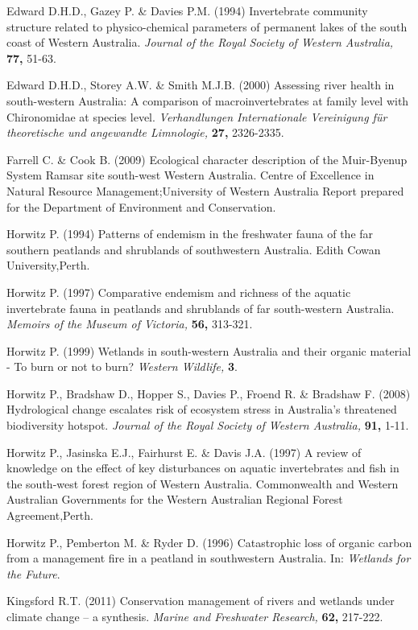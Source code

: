 \documentclass[version=last,
    paper=a4, %
    10pt, %
    usenames,
    dvipsnames,
    oneside, %
    headings=openany, %
    DIV=15 %
]{scrbook}
\begin{document}
Edward D.H.D., Gazey P. \& Davies P.M. (1994) Invertebrate community
structure related to physico-chemical parameters of permanent lakes of
the south coast of Western Australia. \emph{Journal of the Royal Society
of Western Australia,} \textbf{77,} 51-63.

Edward D.H.D., Storey A.W. \& Smith M.J.B. (2000) Assessing river health
in south-western Australia: A comparison of macroinvertebrates at family
level with Chironomidae at species level. \emph{Verhandlungen
Internationale Vereinigung für theoretische und angewandte Limnologie,}
\textbf{27,} 2326-2335.

Farrell C. \& Cook B. (2009) Ecological character description of the
Muir-Byenup System Ramsar site south-west Western Australia. Centre of
Excellence in Natural Resource Management;University of Western
Australia Report prepared for the Department of Environment and
Conservation.

Horwitz P. (1994) Patterns of endemism in the freshwater fauna of the
far southern peatlands and shrublands of southwestern Australia. Edith
Cowan University,Perth.

Horwitz P. (1997) Comparative endemism and richness of the aquatic
invertebrate fauna in peatlands and shrublands of far south-western
Australia. \emph{Memoirs of the Museum of Victoria,} \textbf{56,}
313-321.

Horwitz P. (1999) Wetlands in south-western Australia and their organic
material - To burn or not to burn? \emph{Western Wildlife,} \textbf{3}.

Horwitz P., Bradshaw D., Hopper S., Davies P., Froend R. \& Bradshaw F.
(2008) Hydrological change escalates risk of ecosystem stress in
Australia's threatened biodiversity hotspot. \emph{Journal of the Royal
Society of Western Australia,} \textbf{91,} 1-11.

Horwitz P., Jasinska E.J., Fairhurst E. \& Davis J.A. (1997) A review of
knowledge on the effect of key disturbances on aquatic invertebrates and
fish in the south-west forest region of Western Australia. Commonwealth
and Western Australian Governments for the Western Australian Regional
Forest Agreement,Perth.

Horwitz P., Pemberton M. \& Ryder D. (1996) Catastrophic loss of organic
carbon from a management fire in a peatland in southwestern Australia.
In: \emph{Wetlands for the Future}.

Kingsford R.T. (2011) Conservation management of rivers and wetlands
under climate change -- a synthesis. \emph{Marine and Freshwater
Research,} \textbf{62,} 217-222.
\end{document}
